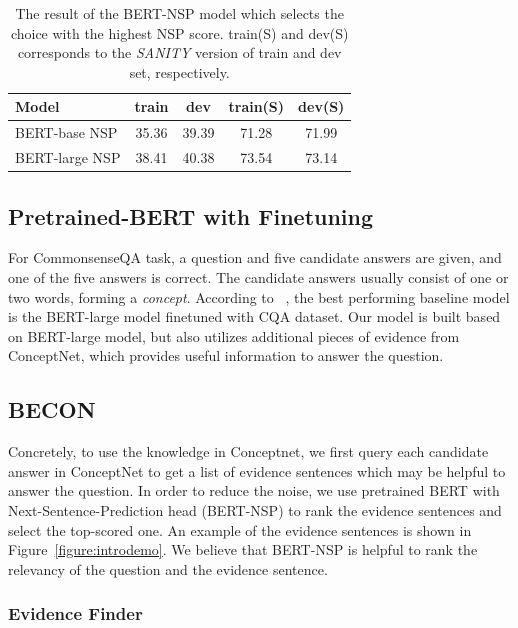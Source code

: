 \documentclass[letterpaper]{article} %
\begin{document}
\begin{table}[t!]
  \centering
  \begin{tabular}{l c c c c}
  \hline\hline
  {\bf Model}  & {\bf train } & {\bf dev} & {\bf train(S)} & {\bf dev(S)} \\
  \hline
  BERT-base NSP & 35.36 & 39.39 & 71.28 & 71.99 \\
  BERT-large NSP & 38.41 & 40.38 & 73.54 & 73.14 \\
  \hline\hline
  \end{tabular}
  \caption{The result of the BERT-NSP model which selects the choice with the highest NSP score. train(S) and dev(S) corresponds to the {\it SANITY} version of train and dev set, respectively.}
  \label{table:simple_bert_nsp_model}
\end{table}

\subsection{Pretrained-BERT with Finetuning}

For CommonsenseQA task, a question and five candidate answers are given, and one of the five answers is correct. The candidate answers usually consist of one or two words, forming a \textit{concept}. According to ~\cite{talmor2018commonsenseqa}, the best performing baseline model is the BERT-large model finetuned with CQA dataset. Our model is built based on BERT-large model, but also utilizes additional pieces of evidence from ConceptNet, which provides useful information to answer the question.

\subsection{BECON}

Concretely, to use the knowledge in Conceptnet, we first query each candidate answer in ConceptNet to get a list of evidence sentences which may be helpful to answer the question. In order to reduce the noise, we use pretrained BERT with Next-Sentence-Prediction head (BERT-NSP) to rank the evidence sentences and select the top-scored one. An example of the evidence sentences is shown in Figure~\ref{figure:introdemo}. We believe that BERT-NSP is helpful to rank the relevancy of the question and the evidence sentence.

\subsubsection{Evidence Finder}
\end{document}
